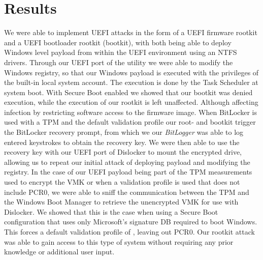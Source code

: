 
\chapter{Results}

We were able to implement \ac{UEFI} attacks in the form of a \ac{UEFI} firmware rootkit and a \ac{UEFI} bootloader rootkit (bootkit), with both being able to deploy Windows level payload from within the \ac{UEFI} environment using an \ac{NTFS} drivers.
Through our \ac{UEFI} port of the  utility we were able to modify the Windows registry, so that our Windows payload is executed with the privileges of the built-in local system account.
The execution is done by the Task Scheduler at system boot.
With Secure Boot enabled we showed that our bootkit was denied execution, while the execution of our rootkit is left unaffected. Although affecting infection by restricting software access to the firmware image.
When BitLocker is used with a \ac{TPM} and the default validation profile  our root- and bootkit trigger the BitLocker recovery prompt, from which we our \emph{BitLogger} was able to log entered keystrokes to obtain the recovery key.
We were then able to use the recovery key with our \ac{UEFI} port of Dislocker to mount the encrypted drive, allowing us to repeat our initial attack of deploying payload and modifying the registry.
In the case of our \ac{UEFI} payload being part of the \ac{TPM} measurements used to encrypt the \ac{VMK} or when a validation profile is used that does not include \ac{PCR}0, we were able to sniff the communication between the \ac{TPM} and the Windows Boot Manager to retrieve the unencrypted \ac{VMK} for use with Dislocker.
We showed that this is the case when using a Secure Boot configuration that uses only Microsoft's signature \ac{DB} required to boot Windows.
This forces a default validation profile of , leaving out \ac{PCR}0.
Our rootkit attack was able to gain access to this type of system without requiring any prior knowledge or additional user input.